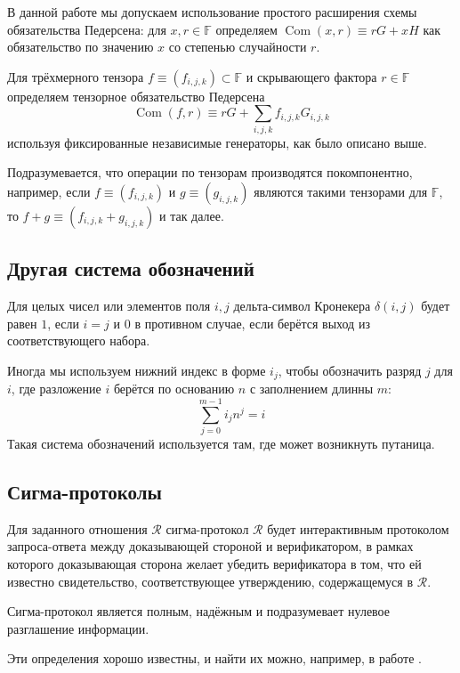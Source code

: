 \documentclass{article}
\newcommand{\F}{\mathbb{F}}
\newcommand{\com}{\operatorname{Com}}
\theoremstyle{definition}
\begin{document}
В данной работе мы допускаем использование простого расширения схемы обязательства Педерсена: для $x,r \in \F$ определяем $\com(x,r) \equiv rG + xH$ как обязательство по значению $x$ со степенью случайности $r$.

Для трёхмерного тензора $f \equiv (f_{i,j,k}) \subset \F$ и скрывающего фактора $r \in \F$ определяем тензорное обязательство Педерсена
$$\com(f,r) \equiv rG + \sum_{i,j,k} f_{i,j,k} G_{i,j,k}$$
используя фиксированные независимые генераторы, как было описано выше.

Подразумевается, что операции по тензорам производятся покомпонентно, например, если $f \equiv (f_{i,j,k})$ и $g \equiv (g_{i,j,k})$ являются такими тензорами для $\F$, то $f + g \equiv (f_{i,j,k} + g_{i,j,k})$ и так далее.


\subsection{Другая система обозначений}
Для целых чисел или элементов поля $i,j$ дельта-символ Кронекера $\delta(i,j)$ будет равен $1$, если $i=j$ и $0$ в противном случае, если берётся выход из соответствующего набора.

Иногда мы используем нижний индекс в форме $i_j$, чтобы обозначить разряд $j$ для $i$, где разложение $i$ берётся по основанию $n$ с заполнением длинны $m$:
$$\sum_{j=0}^{m-1} i_j n^j = i$$
Такая система обозначений используется там, где может возникнуть путаница.


\subsection{Сигма-протоколы}
Для заданного отношения $\mathcal{R}$ сигма-протокол $\mathcal{R}$ будет интерактивным протоколом запроса-ответа между доказывающей стороной и верификатором, в рамках которого доказывающая сторона желает убедить верификатора в том, что ей известно свидетельство, соответствующее утверждению, содержащемуся в $\mathcal{R}$.

Сигма-протокол является полным, надёжным и подразумевает нулевое разглашение информации.

Эти определения хорошо известны, и найти их можно, например, в работе \cite{groth}.
\end{document}
